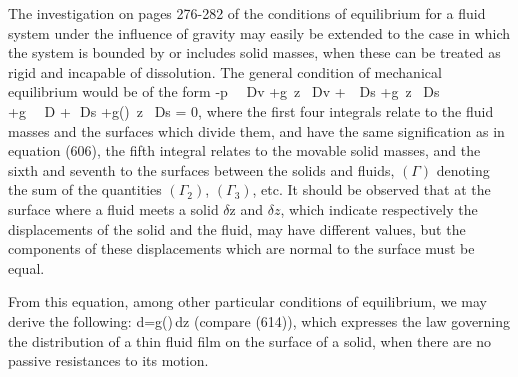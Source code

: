 \documentclass[12pt]{memoir}
\newcommand{\dd}{\delta}
\begin{document}
The investigation on pages 276-282 of the conditions of equilibrium for a fluid system  under the influence of gravity may easily be extended to the case in which the system is bounded by or includes solid masses, when these can be treated as rigid and incapable of dissolution. The general condition of mechanical equilibrium would be of the form
\eqs-\int p \, \dd \, Dv +\int g\gamma\, \dd z \, Dv +\int \sigma \, \dd \, Ds +\int g\Gamma \, \dd z \, Ds \\
+\int g \, \dd {} \, D +\int \varsigma \,\dd\, Ds +\int g(\Gamma)\, \dd z \, Ds = 0,  \label{680}  \eqe
where the first four integrals relate to the fluid masses and the surfaces which divide them, and have the same signification as in equation (606), the fifth integral relates to the movable solid masses, and the sixth and seventh to the surfaces between the solids and fluids, $(\Gamma)$ denoting the sum of the quantities $(\Gamma_2)$, $(\Gamma_3)$, etc. It should be observed that at the surface where a fluid meets a solid $\dd \text{z}$ and $\dd z$, which indicate respectively the displacements of the solid and the fluid, may have different values, but the components of these displacements which are normal to the surface must be equal.

From this equation, among other particular conditions of equilibrium, we may derive the following:
\eqs d\varepsilon =g(\Gamma)\,dz    \label{681} \eqe
(compare (614)), which expresses the law governing the distribution of a thin fluid film on the surface of a solid, when there are no passive resistances to its motion.
\end{document}
